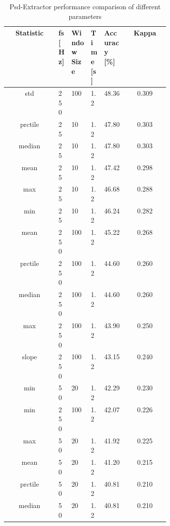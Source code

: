 \documentclass{article}
\begin{document}
\begin{table}[H]
 \centering
 \begin{tabular}{|c|C{0.05\linewidth}|C{0.12\linewidth}|C{0.08\linewidth}|C{0.14\linewidth}|c|}
 \hline
   \textbf{Statistic} & \textbf{fs [Hz]} & \centering\textbf{Window Size} & \textbf{Time [s]} & \textbf{Accuracy [\%]} & \textbf{Kappa} \\\hline
   std      & 250 & 100 & 1.2 & 48.36 & 0.309 \\
   prctile  & 25  & 10  & 1.2 & 47.80 & 0.303 \\
   median   & 25  & 10  & 1.2 & 47.80 & 0.303 \\
   mean     & 25  & 10  & 1.2 & 47.42 & 0.298 \\
   max      & 25  & 10  & 1.2 & 46.68 & 0.288 \\
   min      & 25  & 10  & 1.2 & 46.24 & 0.282 \\
   mean     & 250 & 100 & 1.2 & 45.22 & 0.268 \\
   prctile  & 250 & 100 & 1.2 & 44.60 & 0.260 \\
   median   & 250 & 100 & 1.2 & 44.60 & 0.260 \\
   max      & 250 & 100 & 1.2 & 43.90 & 0.250 \\
   slope    & 250 & 100 & 1.2 & 43.15 & 0.240 \\
   min      & 50  & 20  & 1.2 & 42.29 & 0.230 \\
   min      & 250 & 100 & 1.2 & 42.07 & 0.226 \\
   max      & 50  & 20  & 1.2 & 41.92 & 0.225 \\
   mean     & 50  & 20  & 1.2 & 41.20 & 0.215 \\
   prctile  & 50  & 20  & 1.2 & 40.81 & 0.210 \\
   median   & 50  & 20  & 1.2 & 40.81 & 0.210 \\\hline
 \end{tabular}
 \caption{Psd-Extractor performance comparison of different parameters}
 \label{tbl:psd-feature-comparison-table}
\end{table} 
\end{document}
